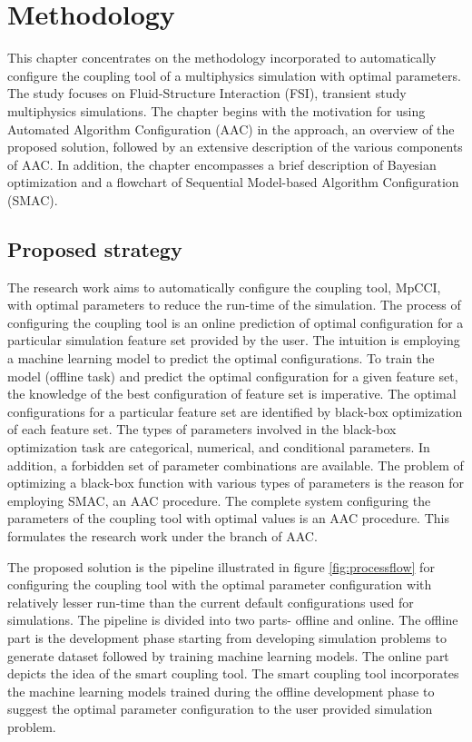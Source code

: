 
\chapter{Methodology}
\label{chapter:methodology}
This chapter concentrates on the methodology incorporated to automatically configure the coupling tool of a multiphysics simulation with optimal parameters. The study focuses on Fluid-Structure Interaction (FSI), transient study multiphysics simulations. The chapter begins with the motivation for using Automated Algorithm Configuration (AAC) in the approach, an overview of the proposed solution, followed by an extensive description of the various components of AAC. In addition, the chapter encompasses a brief description of Bayesian optimization and a flowchart of Sequential Model-based Algorithm Configuration (SMAC).
    
\section{Proposed strategy}

The research work aims to automatically configure the coupling tool, MpCCI, with optimal parameters to reduce the run-time of the simulation. The process of configuring the coupling tool is an online prediction of optimal configuration for a particular simulation feature set provided by the user. The intuition is employing a machine learning model to predict the optimal configurations. To train the model (offline task) and predict the optimal configuration for a given feature set, the knowledge of the best configuration of feature set is imperative. The optimal configurations for a particular feature set are identified by black-box optimization of each feature set. The types of parameters involved in the black-box optimization task are categorical, numerical, and conditional parameters. In addition, a forbidden set of parameter combinations are available. The problem of optimizing a black-box function with various types of parameters is the reason for employing SMAC, an AAC procedure. The complete system configuring the parameters of the coupling tool with optimal values is an AAC procedure. This formulates the research work under the branch of AAC.

The proposed solution is the pipeline illustrated in figure \ref{fig:processflow} for configuring the coupling tool with the optimal parameter configuration with relatively lesser run-time than the current default configurations used for simulations. The pipeline is divided into two parts- offline and online. The offline part is the development phase starting from developing simulation problems to generate dataset followed by training machine learning models. The online part depicts the idea of the smart coupling tool. The smart coupling tool incorporates the machine learning models trained during the offline development phase to suggest the optimal parameter configuration to the user provided simulation problem.

